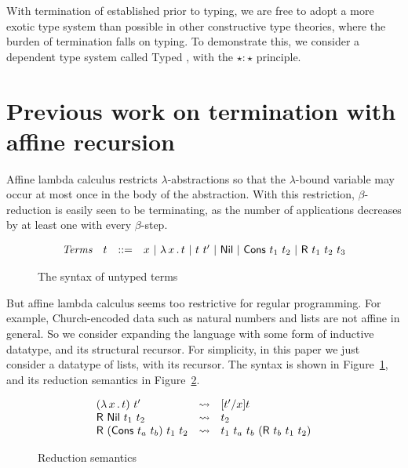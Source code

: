 \documentclass{article}
\begin{document}
With termination of \sar established prior to typing, we are free to
adopt a more exotic type system than possible in other constructive
type theories, where the burden of termination falls on typing.  To
demonstrate this, we consider a dependent type system called Typed
\sar, with the $\star : \star$ principle.

\section{Previous work on termination with affine recursion}
\label{sec:prevaff}

Affine lambda calculus restricts $\lambda$-abstractions so that the
$\lambda$-bound variable may occur at most once in the body of the
abstraction.  With this restriction, $\beta$-reduction is easily seen
to be terminating, as the number of applications decreases by at least
one with every $\beta$-step.

\begin{figure}
  \[
  \begin{array}{llll}
    \textit{Terms} & t & ::= & x\ |\ \lam{x}{t}\ |\ t\ t'\ |\ \mathsf{Nil}\ |\ \mathsf{Cons}\ t_1\ t_2\ |\ \mathsf{R}\ t_1\ t_2\ t_3
  \end{array}
  \]
  \caption{The syntax of untyped terms}
\label{fig:syn}
\end{figure}

But affine lambda calculus seems too restrictive for regular
programming.  For example, Church-encoded data such as natural numbers
and lists are not affine in general.  So we consider expanding the
language with some form of inductive datatype, and its structural
recursor.  For simplicity, in this paper we just consider a datatype of lists, with its
recursor.  The syntax is shown in Figure~\ref{fig:syn}, and its reduction semantics in Figure~\ref{fig:redsem}.

\begin{figure}
  \[
  \begin{array}{lll}
    (\lambda\, x\, .\, t)\ t' & \leadsto & [t'/x]t \\
    \mathsf{R}\ \mathsf{Nil}\ t_1\ t_2 & \leadsto & t_2 \\
    \mathsf{R}\ (\mathsf{Cons}\ t_a\ t_b)\ t_1\ t_2 & \leadsto & t_1\ t_a\ t_b\ (\mathsf{R}\ t_b\ t_1\ t_2)
  \end{array}
  \]
  \caption{Reduction semantics}
\label{fig:redsem}
\end{figure}
\end{document}
